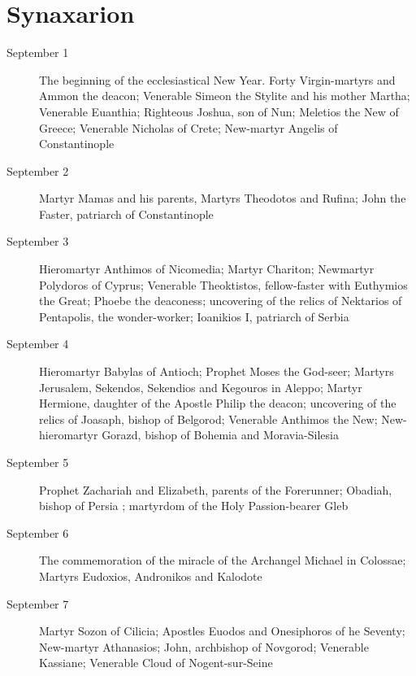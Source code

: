 \section{Synaxarion}

\begin{description}

\item[September 1]

The beginning of the ecclesiastical New Year. Forty Virgin-martyrs and Ammon the deacon; Venerable Simeon the Stylite and his mother Martha; Venerable Euanthia; Righteous Joshua, son of Nun; Meletios the New of Greece; Venerable Nicholas of Crete; New-martyr Angelis of Constantinople

\item[September 2]

Martyr Mamas and his parents, Martyrs Theodotos and Rufina; John the Faster, patriarch of Constantinople

\item[September 3]

Hieromartyr Anthimos of Nicomedia; Martyr Chariton; Newmartyr Polydoros of Cyprus; Venerable Theoktistos, fellow-faster with Euthymios the Great; Phoebe the deaconess; uncovering of the relics of Nektarios of Pentapolis, the wonder-worker; Ioanikios I, patriarch of Serbia

\item[September 4]

Hieromartyr Babylas of Antioch; Prophet Moses the God-seer; Martyrs Jerusalem, Sekendos, Sekendios and Kegouros in Aleppo; Martyr Hermione, daughter of the Apostle Philip the deacon; uncovering of the relics of Joasaph, bishop of Belgorod; Venerable Anthimos the New; New-hieromartyr Gorazd, bishop of Bohemia and Moravia-Silesia

\item[September 5]

Prophet Zachariah and Elizabeth, parents of the Forerunner; Obadiah, bishop of Persia ; martyrdom of the Holy Passion-bearer Gleb

\item[September 6]

The commemoration of the miracle of the Archangel Michael in Colossae; Martyrs Eudoxios, Andronikos and Kalodote

\item[September 7]

Martyr Sozon of Cilicia; Apostles Euodos and Onesiphoros of he Seventy; New-martyr Athanasios; John, archbishop of Novgorod; Venerable Kassiane; Venerable Cloud of Nogent-sur-Seine


\end{description}

